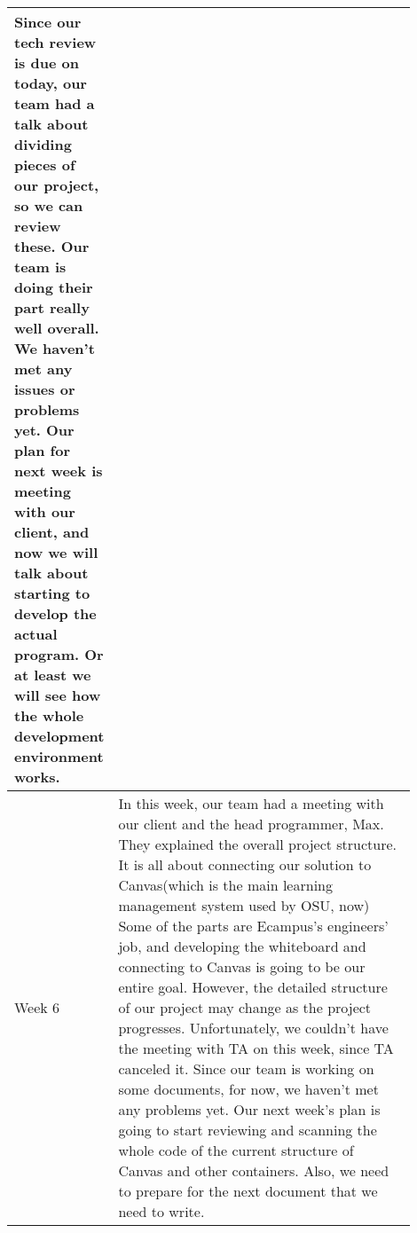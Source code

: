 \documentclass[10pt]{article}
\begin{document}
\begin{center}
\begin{tabular}{ | p{0.1\linewidth} | p{0.8\linewidth} | }
                Since our tech review is due on today, our team had a talk about dividing pieces of our project, so we can review these.
                Our team is doing their part really well overall.
                We haven't met any issues or problems yet.
                Our plan for next week is meeting with our client, and now we will talk about starting to develop the actual program.
                Or at least we will see how the whole development environment works.  \\ \hline
                Week 6 &  In this week, our team had a meeting with our client and the head programmer, Max.
                They explained the overall project structure. It is all about connecting our solution to Canvas(which is the main learning management system used by OSU, now)
                Some of the parts are Ecampus's engineers' job, and developing the whiteboard and connecting to Canvas is going to be our entire goal.
                However, the detailed structure of our project may change as the project progresses.
                Unfortunately, we couldn't have the meeting with TA on this week, since TA canceled it.
                Since our team is working on some documents, for now, we haven't met any problems yet.
                Our next week's plan is going to start reviewing and scanning the whole code of the current structure of Canvas and other containers.
                Also, we need to prepare for the next document that we need to write.  \\ \hline
            \end{tabular}


\end{center}
\end{document}
